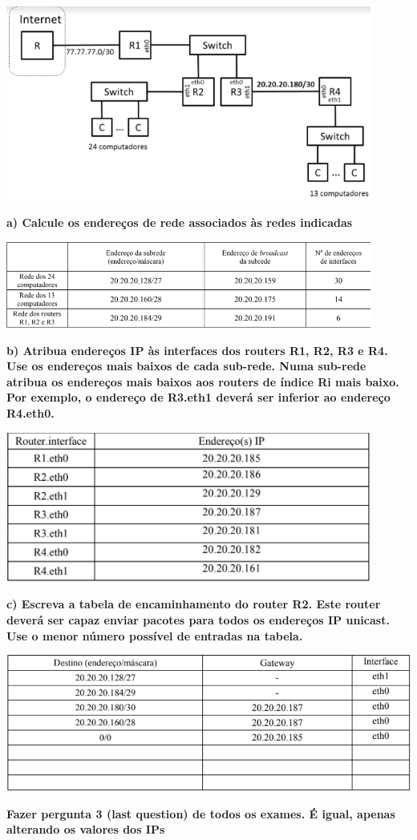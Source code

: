 \documentclass[../resumosRCOM.tex]{subfiles}
\begin{document}
\begin{center}
    \includegraphics[width=12cm]{images/RCOM40.png}
\end{center}
\textbf{a) Calcule os endereços de rede associados às redes indicadas}
\begin{center}
    \includegraphics[width=12cm]{images/RCOM41.png}
\end{center}
\textbf{b) Atribua endereços IP às interfaces dos routers R1, R2, R3 e R4. Use os endereços mais baixos de cada sub-rede. Numa sub-rede atribua os endereços mais baixos aos routers de índice Ri mais baixo. Por exemplo, o endereço de R3.eth1 deverá ser inferior ao endereço R4.eth0.}
\begin{center}
    \includegraphics[width=12cm]{images/RCOM42.png}
\end{center}
\textbf{c) Escreva a tabela de encaminhamento do router R2. Este router deverá ser capaz enviar pacotes para todos os endereços IP unicast. Use o menor número possível de entradas na tabela.}
\begin{center}
    \includegraphics[width=14cm]{images/RCOM43.png}
\end{center}
\textbf{Fazer pergunta 3 (last question) de todos os exames. É igual, apenas alterando os valores dos IPs}
\end{document}
